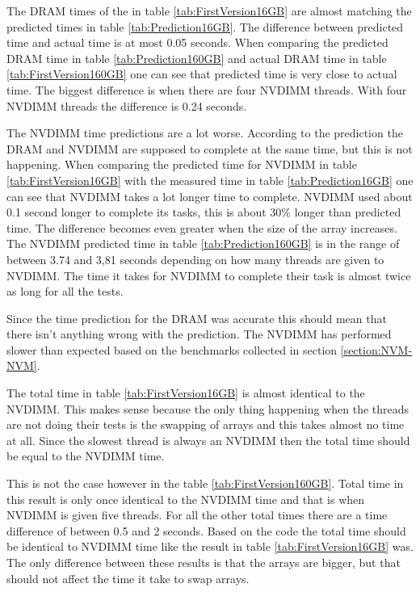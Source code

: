 \documentclass[12pt,a4paper,USenglish]{article}      %
\begin{document}
The DRAM times of the in table \ref{tab:FirstVersion16GB} are almost matching the predicted times in table \ref{tab:Prediction16GB}. The difference between predicted time and actual time is at most 0.05 seconds.
When comparing the predicted DRAM time in table \ref{tab:Prediction160GB} and actual DRAM time in table \ref{tab:FirstVersion160GB} one can see that predicted time is very close to actual time. The biggest difference is when there are four NVDIMM threads. With four NVDIMM threads the difference is 0.24 seconds.

The NVDIMM time predictions are a lot worse. According to the prediction the DRAM and NVDIMM are supposed to complete at the same time, but this is not happening. When comparing the predicted time for NVDIMM in table \ref{tab:FirstVersion16GB} with the measured time in table \ref{tab:Prediction16GB} one can see that NVDIMM takes a lot longer time to complete. NVDIMM used about 0.1 second longer to complete its tasks, this is about 30\% longer than predicted time.
The difference becomes even greater when the size of the array increases. The NVDIMM predicted time in table \ref{tab:Prediction160GB} is in the range of between 3.74 and 3,81 seconds depending on how many threads are given to NVDIMM. The time it takes for NVDIMM to complete their task is almost twice as long for all the tests.

Since the time prediction for the DRAM was accurate this should mean that there isn't anything wrong with the prediction. The NVDIMM has performed slower than expected based on the benchmarks collected in section \ref{section:NVM-NVM}.

The total time in table \ref{tab:FirstVersion16GB} is almost identical to the NVDIMM. This makes sense because the only thing happening when the threads are not doing their tests is the swapping of arrays and this takes almost no time at all. Since the slowest thread is always an NVDIMM then the total time should be equal to the NVDIMM time.

This is not the case however in the table \ref{tab:FirstVersion160GB}. Total time in this result is only once identical to the NVDIMM time and that is when NVDIMM is given five threads. For all the other total times there are a time difference of between 0.5 and 2 seconds. 
Based on the code the total time should be identical to NVDIMM time like the result in table \ref{tab:FirstVersion16GB} was. The only difference between these results is that the arrays are bigger, but that should not affect the time it take to swap arrays. 
\end{document}
